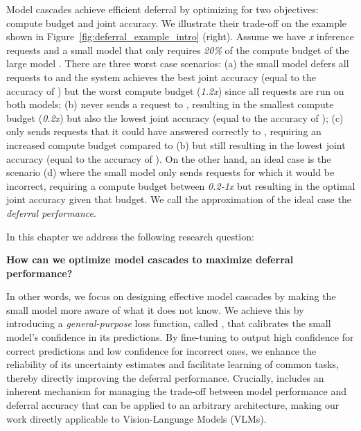 Model cascades achieve efficient deferral by optimizing for two objectives: compute budget and joint accuracy. We illustrate their trade-off on the example shown in Figure~\ref{fig:deferral_example_intro} (right). Assume we have \textit{x} inference requests and a small model \textbf{\smallmodel} that only requires \textit{20\%} of the compute budget of the large model \textbf{\bigmodel}. There are three worst case scenarios: (a) the small model \textbf{\smallmodel} defers all requests to \textbf{\bigmodel} and the system achieves the best joint accuracy (equal to the accuracy of \textbf{\bigmodel}) but the worst compute budget (\textit{1.2x}) since all requests are run on both models; (b) \textbf{\smallmodel} never sends a request to \textbf{\bigmodel}, resulting in the smallest compute budget (\textit{0.2x}) but also the lowest joint accuracy (equal to the accuracy of \textbf{\smallmodel}); (c) \textbf{\smallmodel} only sends requests that it could have answered correctly to \textbf{\bigmodel}, requiring an increased compute budget compared to (b) but still resulting in the lowest joint accuracy (equal to the accuracy of \textbf{\smallmodel}). On the other hand, an ideal case is the scenario (d) where the small model \textbf{\smallmodel} only sends requests for which it would be incorrect, requiring a compute budget between \textit{0.2-1x} but resulting in the optimal joint accuracy given that budget. We call the approximation of the ideal case the \textit{deferral performance}.

In this chapter we address the following research question: 

\begin{center}
\textbf{How can we optimize model cascades to maximize deferral performance?} 
\end{center}


In other words, we focus on designing effective model cascades by making the small model more aware of what it does not know. We achieve this by introducing a \textit{general-purpose} loss function, called \loss, that calibrates the small model’s confidence in its predictions. By fine-tuning \textbf{\smallmodel} to output high confidence for correct predictions and low confidence for incorrect ones, we enhance the reliability of its uncertainty estimates and facilitate learning of common tasks, thereby directly improving the deferral performance.  Crucially, \loss includes an inherent mechanism for managing the trade-off between model performance and deferral accuracy that can be applied to an arbitrary architecture, making our work directly applicable to Vision-Language Models (VLMs). 

